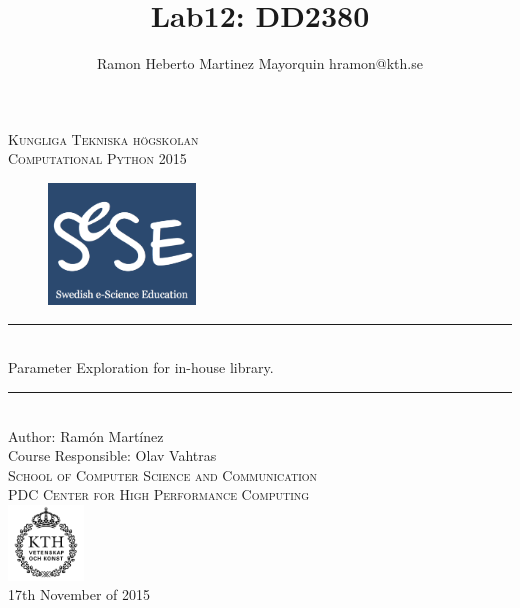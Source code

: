 \documentclass[11pt,a4paper]{article}
\title{Lab12: DD2380 }
\author{
Ramon Heberto Martinez Mayorquin  hramon@kth.se 
}
\newcommand{\HRule}{\rule{\linewidth}{0.5mm}}
\begin{document}
\begin{titlepage}
\begin{center}

\textsc{\LARGE Kungliga Tekniska högskolan}\\[1.0cm]

\textsc{\Large Computational Python 2015}\\[2.0cm]



\begin{figure}[H]
	\centering
 \includegraphics[width=0.35\textwidth]{sese.png}
\end{figure}
%

\HRule \\[0.4cm]
{ \huge  Parameter Exploration for in-house library.
}\\[0.4cm]
\HRule \\[1.5cm]


Author: Ram\'on  Mart\'inez  \\ 
\large Course Responsible: Olav Vahtras  \\ [2.5cm]

\textsc{\Large School of Computer Science and Communication \\
PDC Center for High Performance Computing}\\ [1.0cm] 
\includegraphics[width=0.15\textwidth]{KTH_black.png}\\[1.5cm] %
{\large 17th November of 2015}

\end{center}
\end{titlepage}
\end{document}
